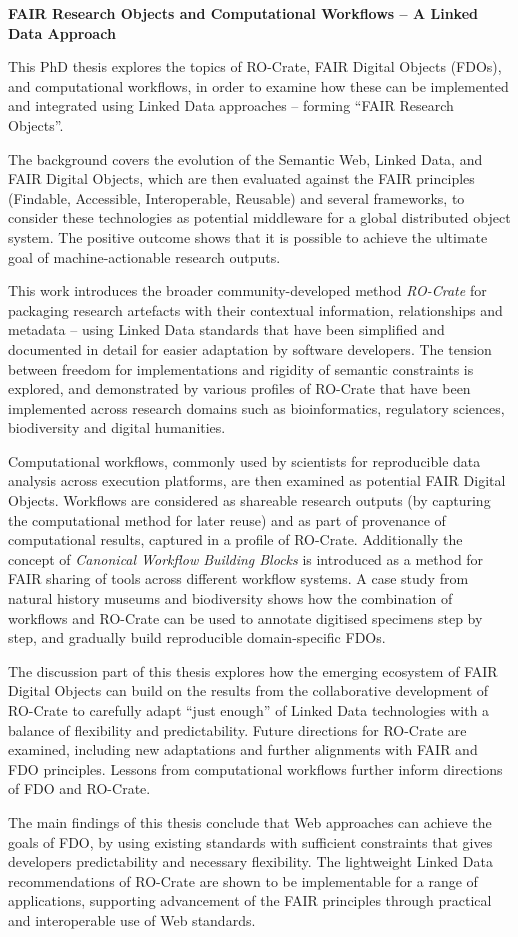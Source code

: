 \textbf{FAIR Research Objects and Computational Workflows – A Linked Data Approach}

This PhD thesis explores the topics of RO-Crate, FAIR Digital Objects (FDOs), and computational workflows, in order to examine how these can be implemented and integrated using Linked Data approaches -- forming ``FAIR Research Objects''.

The background covers the evolution of the Semantic Web, Linked Data, and FAIR Digital Objects, which are then evaluated against the FAIR principles (Findable, Accessible, Interoperable, Reusable) and several frameworks, to consider these technologies as potential middleware for a global distributed object system. The positive outcome shows that it is possible to achieve the ultimate goal of machine-actionable research outputs.

This work introduces the broader community-developed method \emph{RO-Crate} for packaging research artefacts with their contextual information, relationships and metadata -- using Linked Data standards that have been simplified and documented in detail for easier adaptation by software developers. The tension between freedom for implementations and rigidity of semantic constraints is explored, and demonstrated by various profiles of RO-Crate that have been implemented across research domains such as bioinformatics, regulatory sciences, biodiversity and digital humanities.

Computational workflows, commonly used by scientists for reproducible data analysis across execution platforms, are then examined as potential FAIR Digital Objects. Workflows are considered as shareable research outputs (by capturing the computational method for later reuse) and as part of provenance of computational results, captured in a profile of RO-Crate. Additionally the concept of \emph{Canonical Workflow Building Blocks} is introduced as a method for FAIR sharing of tools across different workflow systems. A case study from natural history museums and biodiversity shows how the combination of workflows and RO-Crate can be used to annotate digitised specimens step by step, and gradually build reproducible domain-specific FDOs.

The discussion part of this thesis explores how the emerging ecosystem of FAIR Digital Objects can build on the results from the collaborative development of RO-Crate to carefully adapt ``just enough'' of Linked Data technologies with a balance of flexibility and predictability. Future directions for RO-Crate are examined, including new adaptations and further alignments with FAIR and FDO principles. Lessons from computational workflows further inform directions of FDO and RO-Crate. 

The main findings of this thesis conclude that Web approaches can achieve the goals of FDO, by using existing standards with sufficient constraints that gives developers predictability and necessary flexibility. The lightweight Linked Data recommendations of RO-Crate are shown to be implementable for a range of applications, supporting advancement of the FAIR principles through practical and interoperable use of Web standards. 

